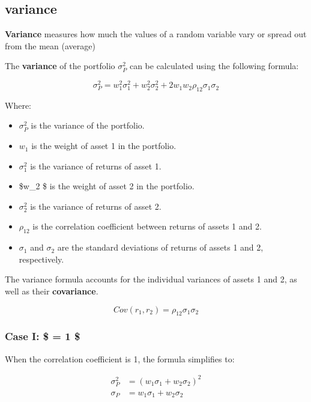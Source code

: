 \documentclass[
]{book}
\providecommand{\tightlist}{%
  \setlength{\itemsep}{0pt}\setlength{\parskip}{0pt}}
\begin{document}
\hypertarget{variance}{%
\subsection{variance}\label{variance}}

\textbf{Variance} measures how much the values of a random variable vary or spread out from the mean (average)

The \textbf{variance} of the portfolio \(\sigma_P^2\) can be calculated using the following formula:

\[ \sigma_P^2 = w_1^2 \sigma_1^2 + w_2^2 \sigma_2^2 + 2w_1 w_2 \rho_{12} \sigma_1 \sigma_2 \]

Where:

\begin{itemize}
\tightlist
\item
  \(\sigma_P^2\) is the variance of the portfolio.
\item
  \(w_1\) is the weight of asset 1 in the portfolio.
\item
  \(\sigma_1^2\) is the variance of returns of asset 1.
\item
  \$w\_2 \$ is the weight of asset 2 in the portfolio.
\item
  \(\sigma_2^2\) is the variance of returns of asset 2.
\item
  \(\rho_{12}\) is the correlation coefficient between returns of assets 1 and 2.
\item
  \(\sigma_1\) and \(\sigma_2\) are the standard deviations of returns of assets 1 and 2, respectively.
\end{itemize}

The variance formula accounts for the individual variances of assets 1 and 2, as well as their \textbf{covariance}.

\[Cov(r_1,r_2 )=\rho_{12} 𝜎_1 𝜎_2\]

\hypertarget{case-i-1}{%
\subsubsection{\texorpdfstring{Case I: \$ \rho = 1 \$}{Case I: \$ = 1 \$}}\label{case-i-1}}

When the correlation coefficient is 1, the formula simplifies to:

\[
\begin{aligned}
\sigma_P^2 &= (w_1 \sigma_1 + w_2 \sigma_2)^2 \\
\sigma_P  &= w_1 \sigma_1 + w_2 \sigma_2 \\
\end{aligned}
\]
\end{document}
